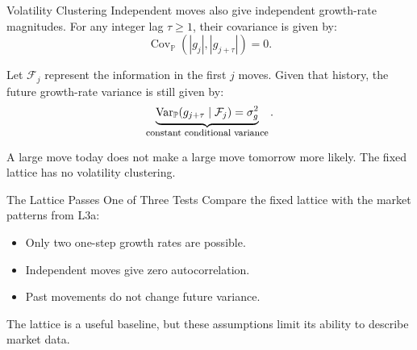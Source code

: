 \documentclass[aspectratio=169,11pt]{beamer}
\newcommand{\Pmeasure}{\mathbb{P}}
\begin{document}
\begin{frame}{Volatility Clustering}
  Independent moves also give independent growth-rate magnitudes.
  For any integer lag $\tau\geq1$, their covariance is given by:
  \[
    \operatorname{Cov}_{\Pmeasure}(|g_j|,|g_{j+\tau}|)=0.
  \]

  Let $\mathcal F_j$ represent the information in the first $j$ moves.
  Given that history, the future growth-rate variance is still given by:
  \[
    \underbrace{\operatorname{Var}_{\Pmeasure}
      (g_{j+\tau}\mid\mathcal F_j)=\sigma_g^2}_{\text{\footnotesize constant conditional variance}}.
  \]

  A large move today does not make a large move tomorrow more likely.
  The fixed lattice has no volatility clustering.
\end{frame}

\begin{frame}{The Lattice Passes One of Three Tests}
  Compare the fixed lattice with the market patterns from L3a:

  \vspace{0.9em}
  \begin{itemize}\setlength{\itemsep}{0.9em}
    \item \textbf{}
      Only two one-step growth rates are possible.
    \item \textbf{}
      Independent moves give zero autocorrelation.
    \item \textbf{}
      Past movements do not change future variance.
  \end{itemize}

  \vspace{0.8em}
  The lattice is a useful baseline, but these assumptions limit its
  ability to describe market data.
\end{frame}
\end{document}
